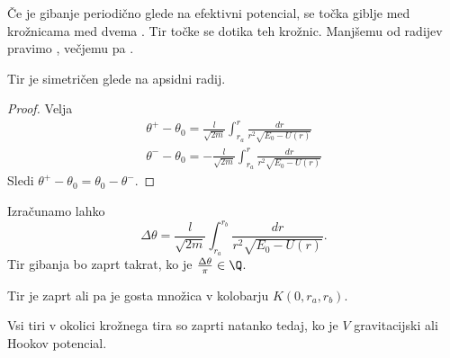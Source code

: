 
Če je gibanje periodično glede na efektivni potencial, se točka giblje med
krožnicama med dvema .
Tir točke se dotika teh krožnic.
Manjšemu od radijev pravimo , večjemu pa .

\begin{trditev}
  Tir je simetričen glede na apsidni radij.
\end{trditev}

\begin{proof}
  Velja
  \begin{gather*}
	\theta^+ - \theta_0 = \frac{l}{\sqrt{2m}} \int_{r_a}^r \frac{dr}{r^2
	  \sqrt{E_0 - U(r)}} \\
	\theta^- - \theta_0 = - \frac{l}{\sqrt{2m}} \int_{r_a}^r \frac{dr}{r^2
	  \sqrt{E_0 - U(r)}}
  \end{gather*}
  Sledi $\theta^+ - \theta_0 = \theta_0 - \theta^-$.
\end{proof}

Izračunamo lahko 
\[
  \Delta \theta = \frac{l}{\sqrt{2m}} \int_{r_a}^{r_b} \frac{dr}{r^2 \sqrt{E_0 -
	U(r)}}.
\]
Tir gibanja bo zaprt takrat, ko je $\frac{\Delta \theta}{\pi} \in \Q$.

\begin{trditev}
  Tir je zaprt ali pa je gosta množica v kolobarju $K(0, r_a, r_b)$.
\end{trditev}

\begin{izrek}[Bertrand]
  Vsi tiri v okolici krožnega tira so zaprti natanko tedaj, ko je $V$
  gravitacijski ali Hookov potencial.
\end{izrek}


